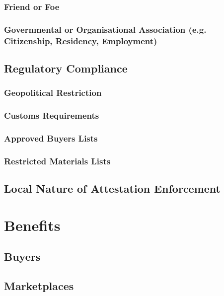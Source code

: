 \subsubsection{Friend or Foe}

\subsubsection{Governmental or Organisational Association (e.g. Citizenship, Residency, Employment)}


\subsection{Regulatory Compliance}

\subsubsection{Geopolitical Restriction}

\subsubsection{Customs Requirements}

\subsubsection{Approved Buyers Lists}

\subsubsection{Restricted Materials Lists}

\subsection{Local Nature of Attestation Enforcement}

\section{Benefits}

\subsection{Buyers}

\subsection{Marketplaces}


